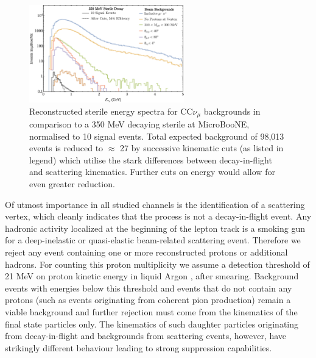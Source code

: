 \documentclass[11pt, a4paper]{article}
\def\muboone{MicroBooNE}
\begin{document}
\begin{figure}[t]
\center
\includegraphics[width=0.6\textwidth,clip,trim=0 0 0 0]{figures/mu_pi_cutflow.pdf}

\caption{\label{fig:mu_pi_cutflow} Reconstructed sterile energy spectra for
CC$\nu_\mu$ backgrounds in comparison to a 350 MeV decaying sterile at
\muboone, normalised to 10 signal events. Total expected background of 98,013
events is reduced to $\approx$ 27 by successive kinematic cuts (as listed in legend) which utilise
the stark differences between decay-in-flight and scattering kinematics. Further cuts on energy would allow for even greater reduction. }
\end{figure}

Of utmost importance in all studied channels is the identification of a
scattering vertex, which cleanly indicates that the process is not a
decay-in-flight event. Any hadronic activity localized at the beginning of the
lepton track is a smoking gun for a deep-inelastic or quasi-elastic
beam-related scattering event. Therefore we reject any event containing one or more
reconstructed protons or additional hadrons. For counting
this proton multiplicity we assume a detection threshold of 21 MeV on proton
kinetic energy in liquid Argon \cite{Acciarri:2014gev}, after smearing.
Background events with energies below this threshold and events that do not contain
any protons (such as events originating from coherent pion production) remain a
viable background and further rejection must come from the kinematics of the
final state particles only. The kinematics of such daughter particles
originating from decay-in-flight and backgrounds from scattering events,
however,  have strikingly different behaviour leading to strong suppression
capabilities.
\end{document}
